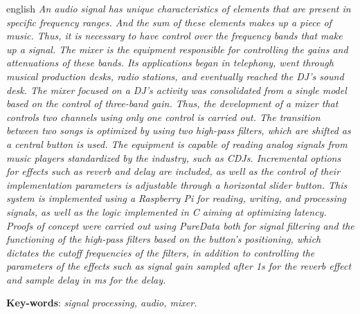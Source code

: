 \begin{resumo}[Abstract]
 \begin{otherlanguage*}{english}
  \textit{An audio signal has unique characteristics of elements that are present in specific frequency ranges. And the sum of these elements makes up a piece of music. Thus, it is necessary to have control over the frequency bands that make up a signal. The \textit{mixer} is the equipment responsible for controlling the gains and attenuations of these bands. Its applications began in telephony, went through musical production desks, radio stations, and eventually reached the DJ's sound desk. The \textit{mixer} focused on a DJ's activity was consolidated from a single model based on the control of three-band gain. Thus, the development of a \textit{mixer} that controls two channels using only one control is carried out. The transition between two songs is optimized by using two high-pass filters, which are shifted as a central button is used. The equipment is capable of reading analog signals from music players standardized by the industry, such as \textit{CDJs}. Incremental options for effects such as \textit{reverb} and \textit{delay} are included, as well as the control of their implementation parameters is adjustable through a horizontal \textit{slider} button. This system is implemented using a \textit{Raspberry Pi} for reading, writing, and processing signals, as well as the logic implemented in C aiming at optimizing latency. Proofs of concept were carried out using \textit{PureData} both for signal filtering and the functioning of the high-pass filters based on the button's positioning, which dictates the cutoff frequencies of the filters, in addition to controlling the parameters of the effects such as signal gain sampled after 1s for the \textit{reverb} effect and sample delay in ms for the \textit{delay}.}
    
   \textbf{Key-words}: \textit{signal processing, audio, mixer.}
 \end{otherlanguage*}
\end{resumo}
